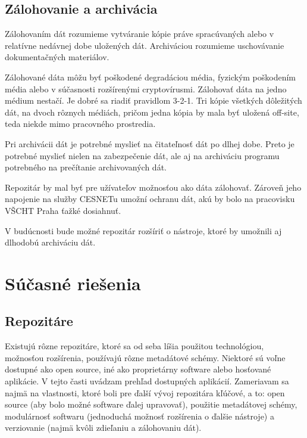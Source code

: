 \documentclass[thesis=M,slovak]{FITthesis}[2013/05/06]
\begin{document}
\section{Zálohovanie a archivácia}
Zálohovaním dát rozumieme vytváranie kópie práve spracúvaných alebo v relatívne nedávnej dobe uložených dát. Archiváciou rozumieme uschovávanie dokumentačných materiálov.

Zálohované dáta môžu byť poškodené degradáciou média, fyzickým poškodením média alebo v súčasnosti rozšírenými cryptovírusmi. Zálohovať dáta na jedno médium nestačí. Je dobré sa riadiť pravidlom 3-2-1. Tri kópie všetkých dôležitých dát, na dvoch rôznych médiách, pričom jedna kópia by mala byť uložená off-site, teda niekde mimo pracovného prostredia. \cite{zalohovanie}

Pri archivácii dát je potrebné myslieť na čitateľnosť dát po dlhej dobe. Preto je potrebné myslieť nielen na zabezpečenie dát, ale aj na archiváciu programu potrebného na prečítanie archivovaných dát.

Repozitár by mal byť pre užívateľov možnosťou ako dáta zálohovať. Zároveň jeho napojenie na služby CESNETu umožní ochranu dát, akú by bolo na pracovisku VŠCHT Praha ťažké dosiahnuť.

V budúcnosti bude možné repozitár rozšíriť o nástroje, ktoré by umožnili aj dlhodobú archiváciu dát.

\chapter{Súčasné riešenia}
\section{Repozitáre}
Existujú rôzne repozitáre, ktoré sa od seba líšia použitou technológiou, možnosťou rozšírenia, používajú rôzne metadátové schémy. Niektoré sú voľne dostupné ako open source, iné ako proprietárny software alebo hosťované aplikácie. V tejto časti uvádzam prehľad dostupných aplikácií. Zameriavam sa najmä na vlastnosti, ktoré boli pre ďalší vývoj repozitára kľúčové, a to: open source (aby bolo možné software ďalej upravovať), použitie metadátovej schémy, modulárnosť softwaru (jednoduchá možnosť rozšírenia o ďalšie nástroje) a verziovanie (najmä kvôli zdieľaniu a zálohovaniu dát).

\end{document}
